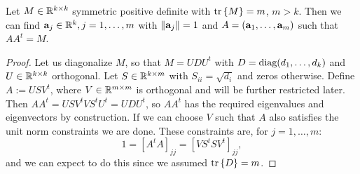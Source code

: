 \documentclass{amsart}
\numberwithin{equation}{section}
\begin{document}
\begin{lemma}\label{lemma:free}
  Let $M \in \mathbb{R}^{k \times k}$ symmetric positive definite with $\textup{tr}\left \{M \right \} =
  m$, $m > k$. Then we can find $\mathbf{a}_j \in \mathbb{R}^k,j=1,\dots,m$ with
  $\|\mathbf{a}_j\|=1$ and $A = (\mathbf{a}_1,\dots,\mathbf{a}_m)$ such that $AA^t =
  M$.
\end{lemma}
\begin{proof}
  Let us diagonalize $M$, so that $M = U D U^t$ with $D =
  \textup{diag}(d_1,\dots,d_k)$ and $U \in \mathbb{R}^{k \times k }$ orthogonal. Let $S
  \in \mathbb{R}^{k \times m}$ with $S_{ii} = \sqrt{d_{i}}$ and zeros
  otherwise. Define $A:= U S V^t$, where $V \in \mathbb{R}^{m \times m}$ is
  orthogonal and will be further restricted later. Then $AA^t = U
  SV^tVS^t U^t = UDU^t$, so $AA^t$ has the required eigenvalues and
  eigenvectors by construction. If we can choose $V$ such that $A$
  also satisfies the unit norm constraints we are done. These
  constraints are, for $j=1,\dots,m$:
  \begin{equation}\label{eq:V constraints}
   1 = [A^tA]_{jj} = [V S^tS V^t]_{jj},
  \end{equation}
  and we can expect to do this since we assumed $\textup{tr}\left \{D \right \} = m$.


\end{proof}
\end{document}
